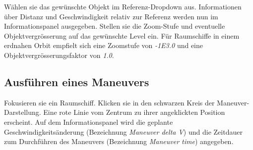Wählen sie das gewünschte Objekt im Referenz-Dropdown aus.
Informationen über Distanz und Geschwindigkeit relativ zur Referenz werden nun im Informationspanel ausgegeben.
Stellen sie die Zoom-Stufe und eventuelle Objektvergrösserung auf das gewünschte Level ein.
Für Raumschiffe in einem erdnahen Orbit empfielt sich eine Zoomstufe von \emph{-1E3.0} und eine Objektvergrösserungsfaktor von \emph{1.0}.

\subsection{Ausführen eines Maneuvers}
Fokusieren sie ein Raumschiff.
Klicken sie in den schwarzen Kreis der Maneuver-Darstellung.
Eine rote Linie vom Zentrum zu ihrer angeklickten Position erscheint.
Auf dem Informationspanel wird die geplante Geschwindigkeitsänderung (Bezeichnung \emph{Maneuver delta V}) und die Zeitdauer zum Durchführen des Maneuvers (Bezeichnung \emph{Maneuver time}) angegeben.


